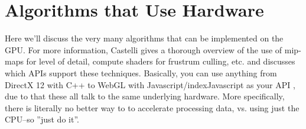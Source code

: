 \section{Algorithms that Use Hardware}
Here we'll discuss the very many algorithms that can be implemented on the GPU. For more information, Castelli
\cite{Castelli2018} gives a thorough overview of the use of mip-maps for level of detail, compute shaders for
frustrum culling, etc. and discusses which APIs support these techniques. Basically, you can use anything from
DirectX 12 with C++ to WebGL with Javascript/index{Javascript} as your API , due
to that these all talk to the same underlying hardware. More specifically, there is literally no better way to
to accelerate processing data, vs. using just the CPU--so ''just do it''.